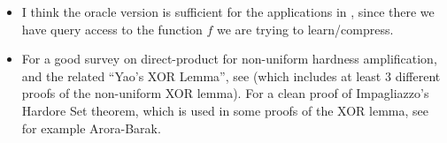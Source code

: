 \documentclass[]{article}
\newcommand{\1}{\mathbb{1}}
\begin{document}
\begin{itemize}
    \item I think the oracle version is sufficient for the applications in
        \cite{learning}, since there we have query access to the function $f$ we
        are trying to learn/compress.

    \item For a good survey on direct-product for non-uniform hardness amplification,
and the related ``Yao's XOR Lemma'', see \cite{yao} (which includes at least 3
different proofs of the non-uniform XOR lemma). For a clean proof of
Impagliazzo's Hardore Set theorem, which is used in some proofs of the XOR
lemma, see for example Arora-Barak.

\end{itemize}


{}

\end{document}
